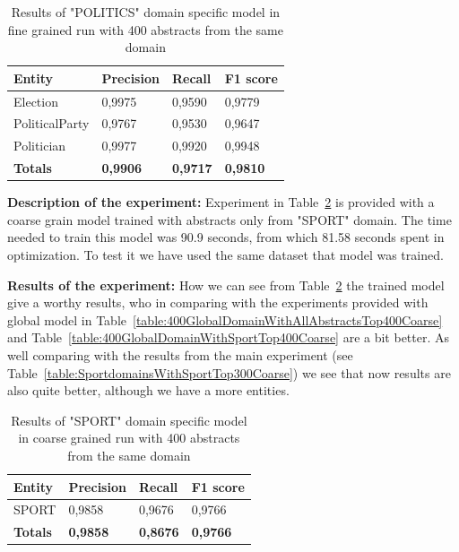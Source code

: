 \documentclass[thesis=M,english]{FITthesis}[2018/05/30]
\begin{document}
	\begin{table}[H]\centering
		\begin{tabular}{|l|l|l|l|}
			\hline {\textbf{Entity}} & {\textbf{Precision}} & {\textbf{Recall}} & {\textbf{F1 score}}\\\hline
				Election & 0,9975 & 0,9590 & 0,9779\\
				PoliticalParty & 0,9767 & 0,9530 & 0,9647\\
				Politician & 0,9977 & 0,9920 & 0,9948\\\hline
				\textbf{Totals} & \textbf{0,9906} & \textbf{0,9717} & \textbf{0,9810}\\\hline
		\end{tabular}
		\caption{Results of "POLITICS" domain specific model in fine grained run with 400 abstracts from the same domain \label{table:400PoliticsDomainWithPoliticsTop400Fine}}
	\end{table}	
	

\textbf{Description of the experiment:} Experiment in Table~\ref{table:400SportDomainWithSportTop400Coarse} is provided with a coarse grain model trained with abstracts only from "SPORT" domain. The time needed to train this model was 90.9 seconds, from which 81.58 seconds spent in optimization. To test it we have used the same dataset that model was trained.  

\textbf{Results of the experiment:} How we can see from Table~\ref{table:400SportDomainWithSportTop400Coarse} the trained model give a worthy results, who in comparing with the experiments provided with global model in Table~\ref{table:400GlobalDomainWithAllAbstractsTop400Coarse} and Table~\ref{table:400GlobalDomainWithSportTop400Coarse} are a bit better. As well comparing with the results from the main experiment (see Table~\ref{table:SportdomainsWithSportTop300Coarse}) we see that now results are also quite better, although we have a more entities.   

	\begin{table}[H]\centering
		\begin{tabular}{|l|l|l|l|}
			\hline {\textbf{Entity}} & {\textbf{Precision}} & {\textbf{Recall}} & {\textbf{F1 score}}\\\hline
				SPORT & 0,9858 & 0,9676 & 0,9766\\\hline
				\textbf{Totals} & \textbf{0,9858} & \textbf{0,8676} & \textbf{0,9766}\\\hline
		\end{tabular}
		\caption{Results of "SPORT" domain specific model in coarse grained run with 400 abstracts from the same domain \label{table:400SportDomainWithSportTop400Coarse}}
	\end{table}
\end{document}
